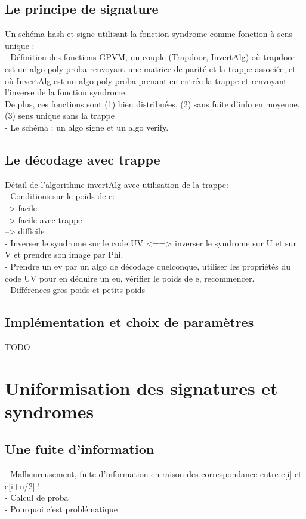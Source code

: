 \documentclass[12pt]{article}
\theoremstyle{definition}
\begin{document}
\subsection{Le principe de signature}
Un schéma hash et signe utilisant la fonction syndrome comme fonction à sens unique : \\
- Définition des fonctions GPVM, un couple (Trapdoor, InvertAlg) où trapdoor est un algo poly proba renvoyant une matrice de parité et la trappe associée, et où InvertAlg est un algo poly proba prenant en entrée la trappe et renvoyant l'inverse de la fonction syndrome. \\
De plus, ces fonctions sont (1) bien distribuées, (2) sans fuite d'info en moyenne, (3) sens unique sans la trappe \\
- Le schéma : un algo signe et un algo verify.

\subsection{Le décodage avec trappe}
Détail de l'algorithme invertAlg avec utilisation de la trappe: \\
- Conditions sur le poids de e: \\
--> facile \\
--> facile avec trappe \\
--> difficile \\
- Inverser le syndrome sur le code UV <==> inverser le syndrome sur U et sur V et prendre son image par Phi. \\
- Prendre un ev par un algo de décodage quelconque, utiliser les propriétés du code UV pour en déduire un eu, vérifier le poids de e, recommencer. \\
- Différences gros poids et petits poids \\

\subsection{Implémentation et choix de paramètres}
TODO \\

\section{Uniformisation des signatures et syndromes}

\subsection{Une fuite d'information}
- Malheureusement, fuite d'information en raison des correspondance entre e[i] et e[i+n/2] ! \\
- Calcul de proba \\
- Pourquoi c'est problématique \\ 
\end{document}
